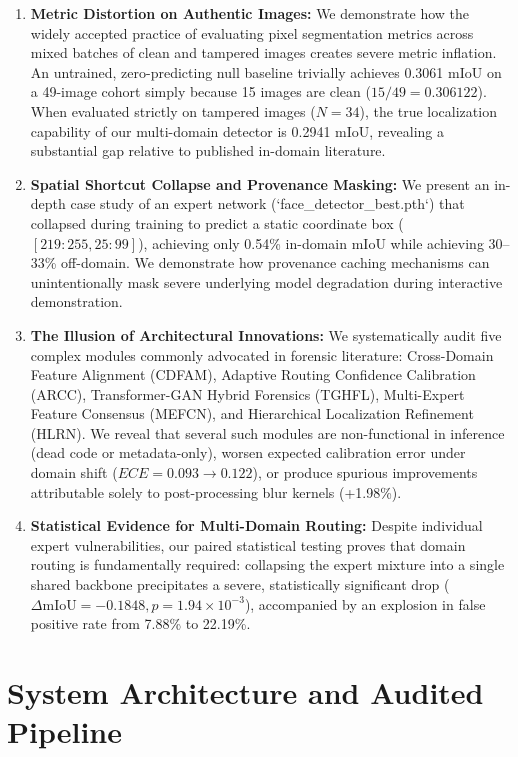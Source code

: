 \documentclass[conference]{IEEEtran}
\begin{document}
\begin{enumerate}
    \item \textbf{Metric Distortion on Authentic Images:} We demonstrate how the widely accepted practice of evaluating pixel segmentation metrics across mixed batches of clean and tampered images creates severe metric inflation. An untrained, zero-predicting null baseline trivially achieves 0.3061 mIoU on a 49-image cohort simply because 15 images are clean ($15/49 = 0.306122$). When evaluated strictly on tampered images ($N=34$), the true localization capability of our multi-domain detector is 0.2941 mIoU, revealing a substantial gap relative to published in-domain literature.
    \item \textbf{Spatial Shortcut Collapse and Provenance Masking:} We present an in-depth case study of an expert network (`face\_detector\_best.pth`) that collapsed during training to predict a static coordinate box ($[219:255, 25:99]$), achieving only 0.54\% in-domain mIoU while achieving 30--33\% off-domain. We demonstrate how provenance caching mechanisms can unintentionally mask severe underlying model degradation during interactive demonstration.
    \item \textbf{The Illusion of Architectural Innovations:} We systematically audit five complex modules commonly advocated in forensic literature: Cross-Domain Feature Alignment (CDFAM), Adaptive Routing Confidence Calibration (ARCC), Transformer-GAN Hybrid Forensics (TGHFL), Multi-Expert Feature Consensus (MEFCN), and Hierarchical Localization Refinement (HLRN). We reveal that several such modules are non-functional in inference (dead code or metadata-only), worsen expected calibration error under domain shift ($ECE = 0.093 \to 0.122$), or produce spurious improvements attributable solely to post-processing blur kernels (+1.98\%).
    \item \textbf{Statistical Evidence for Multi-Domain Routing:} Despite individual expert vulnerabilities, our paired statistical testing proves that domain routing is fundamentally required: collapsing the expert mixture into a single shared backbone precipitates a severe, statistically significant drop ($\Delta\text{mIoU} = -0.1848, p = 1.94 \times 10^{-3}$), accompanied by an explosion in false positive rate from 7.88\% to 22.19\%.
\end{enumerate}

\section{System Architecture and Audited Pipeline}
\end{document}
